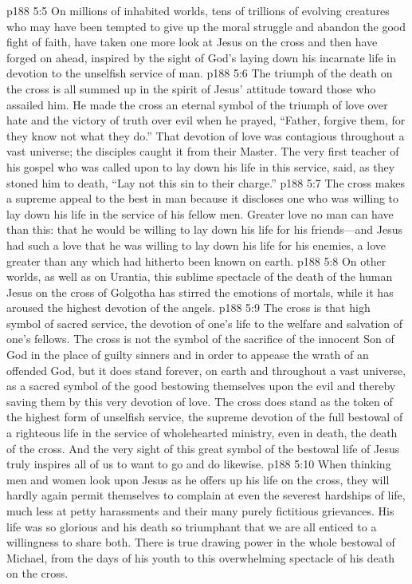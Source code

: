 \pc \vs p188 5:5 On millions of inhabited worlds, tens of trillions of evolving creatures who may have been tempted to give up the moral struggle and abandon the good fight of faith, have taken one more look at Jesus on the cross and then have forged on ahead, inspired by the sight of God’s laying down his incarnate life in devotion to the unselfish service of man.
\vs p188 5:6 The triumph of the death on the cross is all summed up in the spirit of Jesus’ attitude toward those who assailed him. He made the cross an eternal symbol of the triumph of love over hate and the victory of truth over evil when he prayed, \textcolor{ubdarkred}{“Father, forgive them, for they know not what they do.”} That devotion of love was contagious throughout a vast universe; the disciples caught it from their Master. The very first teacher of his gospel who was called upon to lay down his life in this service, said, as they stoned him to death, “Lay not this sin to their charge.”
\vs p188 5:7 The cross makes a supreme appeal to the best in man because it discloses one who was willing to lay down his life in the service of his fellow men. Greater love no man can have than this: that he would be willing to lay down his life for his friends---and Jesus had such a love that he was willing to lay down his life for his enemies, a love greater than any which had hitherto been known on earth.
\vs p188 5:8 On other worlds, as well as on Urantia, this sublime spectacle of the death of the human Jesus on the cross of Golgotha has stirred the emotions of mortals, while it has aroused the highest devotion of the angels.
\pc \vs p188 5:9 The cross is that high symbol of sacred service, the devotion of one’s life to the welfare and salvation of one’s fellows. The cross is not the symbol of the sacrifice of the innocent Son of God in the place of guilty sinners and in order to appease the wrath of an offended God, but it does stand forever, on earth and throughout a vast universe, as a sacred symbol of the good bestowing themselves upon the evil and thereby saving them by this very devotion of love. The cross does stand as the token of the highest form of unselfish service, the supreme devotion of the full bestowal of a righteous life in the service of wholehearted ministry, even in death, the death of the cross. And the very sight of this great symbol of the bestowal life of Jesus truly inspires all of us to want to go and do likewise.
\vs p188 5:10 When thinking men and women look upon Jesus as he offers up his life on the cross, they will hardly again permit themselves to complain at even the severest hardships of life, much less at petty harassments and their many purely fictitious grievances. His life was so glorious and his death so triumphant that we are all enticed to a willingness to share both. There is true drawing power in the whole bestowal of Michael, from the days of his youth to this overwhelming spectacle of his death on the cross.

